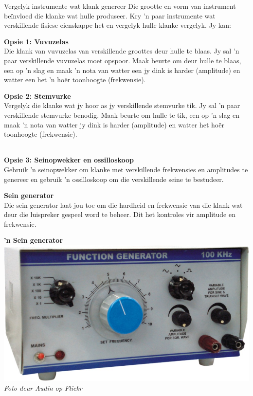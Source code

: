 \begin{activity}{Vergelyk instrumente wat klank genereer}
Die grootte en vorm van instrument be\"invloed die klanke wat hulle produseer. Kry 'n paar instrumente wat verskillende fisiese eienskappe het en vergelyk hulle klanke vergelyk. Jy kan:\par\vspace{1em}
\begin{minipage}{.45\columnwidth}
\textbf{Opsie 1: Vuvuzelas}\\
Die klank van vuvuzelas van verskillende groottes deur hulle te blaas.
Jy sal 'n paar verskillende vuvuzelas moet opspoor. Maak beurte om deur hulle te blaas, een op 'n slag en maak 'n nota van watter een jy dink is harder (amplitude) en watter een het 'n ho\"er toonhoogte (frekwensie).
\end{minipage}\hspace{.05\columnwidth}
\begin{minipage}{.45\columnwidth}
\textbf{Opsie 2: Stemvurke}\\
Vergelyk die klanke wat jy hoor as jy verskillende stemvurke tik.
Jy sal 'n paar verskillende stemvurke benodig. Maak beurte om hulle te tik, een op 'n slag en maak 'n nota van watter jy dink is harder (amplitude) en watter het ho\"er toonhoogte (frekwensie).
\end{minipage}\\
\textbf{Opsie 3: Seinopwekker en ossilloskoop}\\
Gebruik 'n seinopwekker om klanke met verskillende frekwensies en amplitudes te genereer en gebruik 'n ossilloskoop om die verskillende seine te bestudeer.\\
\begin{minipage}{.5\textwidth}
\textbf{Sein generator}\\
Die sein generator laat jou toe om die hardheid en frekwensie van die klank wat deur die luispreker gespeel word te beheer. Dit het kontroles vir amplitude en frekwensie.\\
\end{minipage}
\begin{minipage}{.5\textwidth}
\begin{center}
\textbf{ 'n Sein generator}\\
\includegraphics[width=.8\textwidth]{../Grade10/photos/function_generator.jpg}\\
\textsl{Foto deur Audin op Flickr}\\
\end{center}
\end{minipage}


\end{activity}

